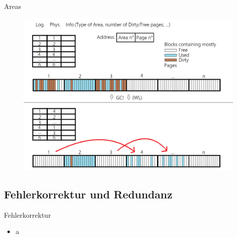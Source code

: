 \documentclass[
	,footlinenumber
	,navline=true
	,footlineauthor
	,ngerman
	]{beamer}
\begin{document}
\begin{frame}{Areas}
	\begin{figure}[H]
		\centering
		\includegraphics[height=0.9\textheight]{../images/Areas_address.png}
	\end{figure}
\end{frame}

\subsection{Fehlerkorrektur und Redundanz}
\begin{frame}{Fehlerkorrektur}
	\begin{block}{}
		\begin{itemize}
			\item a
		\end{itemize}
	\end{block}
\end{frame}
\end{document}
